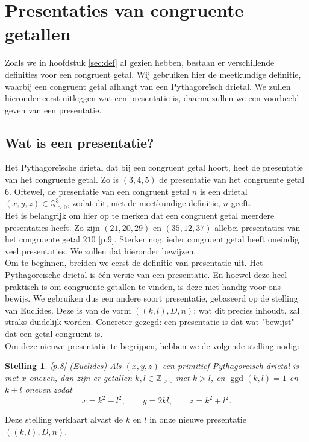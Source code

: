 \documentclass[12pt,reqno]{article}
\newcommand*{\ZZ}{\ensuremath{\mathbb{Z}}}
\newcommand*{\QQ}{\ensuremath{\mathbb{Q}}}
\theoremstyle{theorem}
\newtheorem{theorem}{Stelling}
\theoremstyle{definition}
\DeclareMathOperator{\ggd}{ggd}
\begin{document}
	
	\section{Presentaties van congruente getallen}\label{sec:lotte}
	Zoals we in hoofdstuk \ref{sec:def} al gezien hebben, bestaan er verschillende definities voor een congruent getal. Wij gebruiken hier de meetkundige definitie, waarbij een congruent getal afhangt van een Pythagore\"isch drietal. We zullen hieronder eerst uitleggen wat een presentatie is, daarna zullen we een voorbeeld geven van een presentatie.
	
	\subsection{Wat is een presentatie?}\label{sec:presentaties}
	Het Pythagore\"ische drietal dat bij een congruent getal hoort, heet de presentatie van het congruente getal. Zo is $(3,4,5)$ de presentatie van het congruente getal $6$. Oftewel,  de presentatie van een congruent getal $n$ is een drietal $(x,y,z)\in\QQ^3_{>0}$, zodat dit, met de meetkundige definitie, $n$ geeft.\\
	
	Het is belangrijk om hier op te merken dat een congruent getal meerdere presentaties heeft. Zo zijn $(21,20,29)$ en $(35,12,37)$ allebei presentaties van het congruente getal $210$ \cite{Oort}[p.9]. Sterker nog, ieder congruent getal heeft oneindig veel presentaties. We zullen dat hieronder bewijzen.\\
	
	Om te beginnen, breiden we eerst de definitie van presentatie uit. Het Pythagore\"ische drietal is \'e\'en versie van een presentatie. En hoewel deze heel praktisch is om congruente getallen te vinden, is deze niet handig voor ons bewijs. We gebruiken dus een andere soort presentatie, gebaseerd op de stelling van Euclides. Deze is van de vorm $((k,l),D,n)$; wat dit precies inhoudt, zal straks duidelijk worden. Concreter gezegd: een presentatie is dat wat "bewijst" dat een getal congruent is.\\
	
	Om deze nieuwe presentatie te begrijpen, hebben we de volgende stelling nodig:
	\begin{theorem}\label{def:euclides}
		\cite{Oort}[p.8] (Euclides) Als $(x,y,z)$ een primitief Pythagore\"isch drietal is met $x$ oneven, dan zijn er getallen $k,l\in\ZZ_{>0}$ met $k>l$, en $\ggd(k,l)=1$ en $k+l$ oneven zodat
		\begin{equation*}
			x=k^2-l^2,\qquad y=2kl,\qquad z=k^2+l^2.
		\end{equation*}
	\end{theorem}
	\noindent Deze stelling verklaart alvast de $k$ en $l$ in onze nieuwe presentatie $((k,l),D,n)$.\\
	
\end{document}
